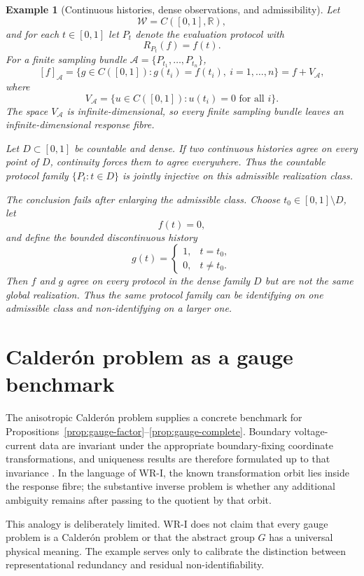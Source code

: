 \documentclass[11pt]{article}
\newtheorem{example}[definition]{Example}
\newcommand{\W}{\mathcal W}
\newcommand{\Acal}{\mathcal A}
\begin{document}
\begin{example}[Continuous histories, dense observations, and admissibility]
Let
\[
\W=C([0,1],\mathbb R),
\]
and for each $t\in[0,1]$ let $P_t$ denote the evaluation protocol with
\[
R_{P_t}(f)=f(t).
\]
For a finite sampling bundle $\Acal=\{P_{t_1},\ldots,P_{t_n}\}$,
\[
[f]_{\Acal}
=
\{g\in C([0,1]):g(t_i)=f(t_i),\ i=1,\ldots,n\}
=
f+V_{\Acal},
\]
where
\[
V_{\Acal}
=
\{u\in C([0,1]):u(t_i)=0\text{ for all }i\}.
\]
The space $V_{\Acal}$ is infinite-dimensional, so every finite sampling bundle
leaves an infinite-dimensional response fibre.

Let $D\subset[0,1]$ be countable and dense. If two continuous histories agree
on every point of $D$, continuity forces them to agree everywhere. Thus the countable protocol family $\{P_t:t\in D\}$ is jointly injective on
this admissible realization class.

The conclusion fails after enlarging the admissible class. Choose
$t_0\in[0,1]\setminus D$, let
\[
f(t)=0,
\]
and define the bounded discontinuous history
\[
g(t)=
\begin{cases}
1,&t=t_0,\\
0,&t\neq t_0.
\end{cases}
\]
Then $f$ and $g$ agree on every protocol in the dense family $D$ but are not the
same global realization. Thus the same protocol family can be identifying on
one admissible class and non-identifying on a larger one.
\end{example}

\section{Calder\'on problem as a gauge benchmark}

The anisotropic Calder\'on problem supplies a concrete benchmark for
Propositions~\ref{prop:gauge-factor}--\ref{prop:gauge-complete}. Boundary
voltage-current data are invariant under the appropriate boundary-fixing
coordinate transformations, and uniqueness results are therefore formulated
up to that invariance \cite{LassasLiimatainenSalo2020}. In the language of
WR-I, the known transformation orbit lies inside the response fibre; the
substantive inverse problem is whether any additional ambiguity remains after
passing to the quotient by that orbit.

This analogy is deliberately limited. WR-I does not claim that every gauge
problem is a Calder\'on problem or that the abstract group $G$ has a universal
physical meaning. The example serves only to calibrate the distinction between
representational redundancy and residual non-identifiability.
\end{document}
